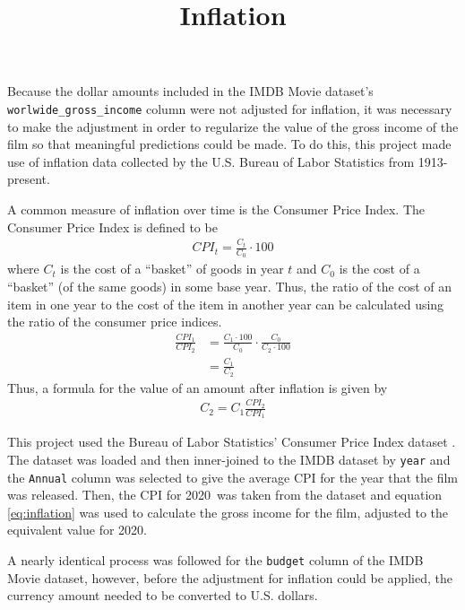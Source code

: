 \documentclass{article}
\title{Inflation}
\newcommand{\adjustmentyear}{2020}
\begin{document}
    \maketitle

    Because the dollar amounts included in the IMDB Movie dataset's \texttt{worlwide\_gross\_income} column were not adjusted for inflation, it was necessary to make the adjustment in order to regularize the value of the gross income of the film so that meaningful predictions could be made.
    To do this, this project made use of inflation data collected by the U.S. Bureau of Labor Statistics from 1913-present.
    
    A common measure of inflation over time is the Consumer Price Index.
    The Consumer Price Index is defined to be
    \begin{align}
        CPI_t = \frac{C_t}{C_0}\cdot100 \label{eq:cpi}
    \end{align}
    where $C_t$ is the cost of a ``basket'' of goods in year $t$ and $C_0$ is the cost of a ``basket'' (of the same goods) in some base year.
    Thus, the ratio of the cost of an item in one year to the cost of the item in another year can be calculated using the ratio of the consumer price indices.
    \begin{align*}
        \frac{CPI_1}{CPI_2} &= \frac{C_1\cdot100}{C_0} \cdot \frac{C_0}{C_2\cdot100} \\
        &= \frac{C_1}{C_2}
    \end{align*}
    Thus, a formula for the value of an amount after inflation is given by
    \begin{align}
        C_2 = C_1 \frac{CPI_2}{CPI_1} \label{eq:inflation}
    \end{align}

    This project used the Bureau of Labor Statistics' Consumer Price Index dataset \cite*{cpi}.
    The dataset was loaded and then inner-joined to the IMDB dataset by \texttt{year} and the \texttt{Annual} column was selected to give the average CPI for the year that the film was released.
    Then, the CPI for \adjustmentyear~was taken from the dataset and equation \eqref{eq:inflation} was used to calculate the gross income for the film, adjusted to the equivalent value for \adjustmentyear.

    A nearly identical process was followed for the \texttt{budget} column of the IMDB Movie dataset, however, before the adjustment for inflation could be applied, the currency amount needed to be converted to U.S. dollars.

    \printbibliography
\end{document}
